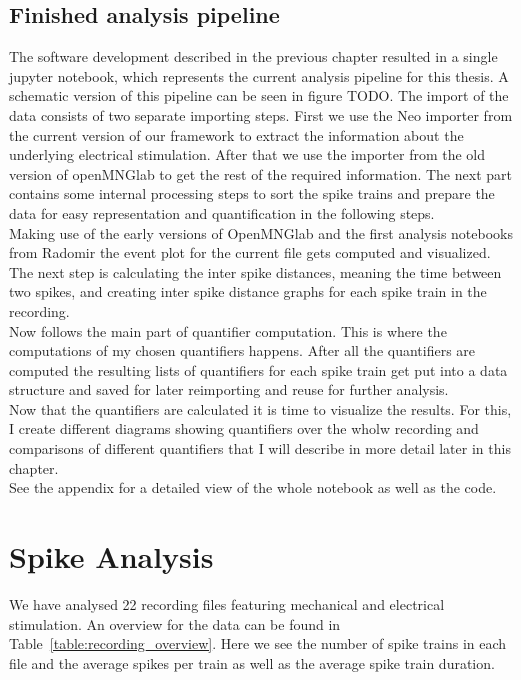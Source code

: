 \subsection{Finished analysis pipeline}
The software development described in the previous chapter resulted in a single jupyter notebook, which represents the current analysis pipeline for this thesis. A schematic version of this pipeline can be seen in figure TODO. The import of the data consists of two separate importing steps. First we use the Neo importer from the current version of our framework to extract the information about the underlying electrical stimulation. After that we use the importer from the old version of openMNGlab to get the rest of the required information. The next part contains some internal processing steps to sort the spike trains and prepare the data for easy representation and quantification in the following steps.\\
Making use of the early versions of OpenMNGlab and the first analysis notebooks from Radomir the event plot for the current file gets computed and visualized. The next step is calculating the inter spike distances, meaning the time between two spikes, and creating inter spike distance graphs for each spike train in the recording.\\
Now follows the main part of quantifier computation. This is where the computations of my chosen quantifiers happens. After all the quantifiers are computed the resulting lists of quantifiers for each spike train get put into a data structure and saved for later reimporting and reuse for further analysis.\\
Now that the quantifiers are calculated it is time to visualize the results. For this, I create different diagrams showing quantifiers over the wholw recording and comparisons of different quantifiers that I will describe in more detail later in this chapter.\\
See the appendix for a detailed view of the whole notebook as well as the code.


\section{Spike Analysis}


We have analysed 22 recording files featuring  mechanical and electrical stimulation. An overview for the data can be found in  Table~\ref{table:recording_overview}. Here we see the number of spike trains in each file and the average spikes per train as well as the average spike train duration.

